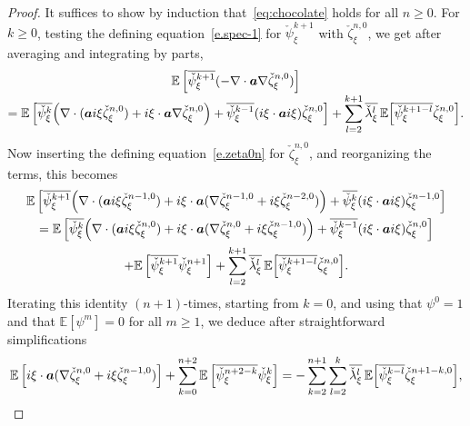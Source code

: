 \documentclass[10pt,a4paper]{article}
\theoremstyle{plain}
\theoremstyle{definition}
\numberwithin{equation}{section}
\newcommand{\Aa}{\boldsymbol a}
\newcommand{\expec}[1]{\mathbb{E}\left[ #1 \right]}
\newcommand{\Bexpec}[1]{\mathbb{E}\Bigl[ #1 \Bigr]}
\begin{document}
\begin{proof}
It suffices to show by induction that~\eqref{eq:chocolate} holds for all $n\ge0$.
For $k\ge0$, testing the defining equation~\eqref{e.spec-1} for $\check\psi^{k+1}_\xi$ with $\check\zeta^{n,0}_\xi$, we get after averaging and integrating by parts,\vspace*{-3pt}
\begin{multline*}
\expec{\overline{\check \psi^{k+1}_\xi} (-\nabla \cdot \Aa \nabla \check\zeta^{n,0}_\xi)}\\[-3pt]
= \expec{\overline{\check\psi^k_\xi} \Big(\nabla \cdot (\Aa i \xi \check\zeta_\xi^{n,0})+i \xi \cdot \Aa\nabla \check\zeta_\xi^{n,0}\Big) +\overline{\check \psi_\xi^{k-1}}(i\xi \cdot\Aa i\xi)\check \zeta_\xi^{n,0}}
+\sum_{l=2}^{k+1}\overline{\check \lambda_\xi^l}\,\Bexpec{\overline{\check \psi_\xi^{k+1-l}}\check\zeta_\xi^{n,0}}.
\end{multline*}
Now inserting the defining equation~\eqref{e.zeta0n} for $\check\zeta_\xi^{n,0}$, and reorganizing the terms, this becomes\vspace*{-3pt}
\begin{multline*}
\expec{\overline{\check \psi_\xi^{k+1}} \Big(\nabla\cdot(\Aa i\xi\check\zeta_\xi^{n-1,0})+i\xi\cdot\Aa(\nabla\check\zeta_\xi^{n-1,0}+i\xi\check\zeta_\xi^{n-2,0})\Big)
+\overline{\check\psi_\xi^k} (i \xi \cdot \Aa i\xi)\check\zeta_\xi^{n-1,0} }\\
= \expec{\overline{\check\psi_\xi^k} \Big(\nabla \cdot (\Aa i \xi \check\zeta_\xi^{n,0})+ i \xi \cdot \Aa(\nabla \check\zeta_\xi^{n,0}+i\xi\check\zeta_\xi^{n-1,0})\Big)
+\overline{\check \psi_\xi^{k-1}}(i\xi \cdot\Aa i\xi)\check \zeta_\xi^{n,0}}\\
+\expec{\overline{\check \psi_\xi^{k+1}}\check\psi_\xi^{n+1}}
+\sum_{l=2}^{k+1}\overline{\check \lambda_\xi^l}\,\Bexpec{ \overline{\check \psi_\xi^{k+1-l}}\check\zeta_\xi^{n,0}}.
\end{multline*}
Iterating this identity $(n+1)$-times, starting from $k=0$, and using that $\psi^0=1$ and that $\expec{\psi^m}=0$ for all $m\geq 1$, we deduce after straightforward simplifications\vspace*{-3pt}
\begin{equation*}
\expec{i\xi \cdot \Aa(\nabla \check\zeta_\xi^{n,0}+i\xi\check\zeta_\xi^{n-1,0})}+\sum_{k=0}^{n+2}\expec{\overline{\check \psi_\xi^{n+2-k}}\check\psi_\xi^{k}}
=-\sum_{k=2}^{n+1}\sum_{l=2}^{k}\overline{\check \lambda_\xi^l}\,\Bexpec{ \overline{\check \psi_\xi^{k-l}}\check\zeta_\xi^{n+1-k,0}},
\end{equation*}

\end{proof}
\end{document}
